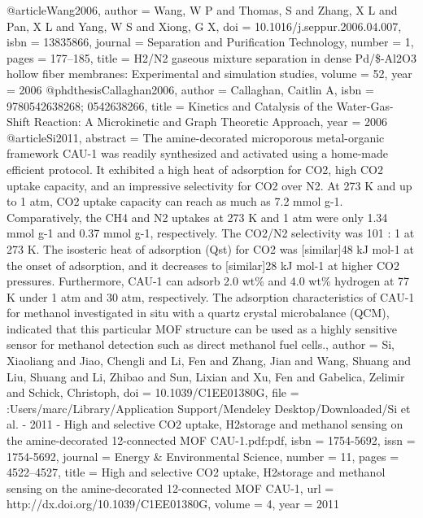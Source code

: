@article{Wang2006,
author = {Wang, W P and Thomas, S and Zhang, X L and Pan, X L and Yang, W S and Xiong, G X},
doi = {10.1016/j.seppur.2006.04.007},
isbn = {13835866},
journal = {Separation and Purification Technology},
number = {1},
pages = {177--185},
title = {{H2/N2 gaseous mixture separation in dense Pd/{\$}\alpha{\$}-Al2O3 hollow fiber membranes: Experimental and simulation studies}},
volume = {52},
year = {2006}
}
@phdthesis{Callaghan2006,
author = {Callaghan, Caitlin A},
isbn = {9780542638268; 0542638266},
title = {{Kinetics and Catalysis of the Water-Gas-Shift Reaction: A Microkinetic and Graph Theoretic Approach}},
year = {2006}
}
@article{Si2011,
abstract = {The amine-decorated microporous metal-organic framework CAU-1 was readily synthesized and activated using a home-made efficient protocol. It exhibited a high heat of adsorption for CO2, high CO2 uptake capacity, and an impressive selectivity for CO2 over N2. At 273 K and up to 1 atm, CO2 uptake capacity can reach as much as 7.2 mmol g-1. Comparatively, the CH4 and N2 uptakes at 273 K and 1 atm were only 1.34 mmol g-1 and 0.37 mmol g-1, respectively. The CO2/N2 selectivity was 101 : 1 at 273 K. The isosteric heat of adsorption (Qst) for CO2 was [similar]48 kJ mol-1 at the onset of adsorption, and it decreases to [similar]28 kJ mol-1 at higher CO2 pressures. Furthermore, CAU-1 can adsorb 2.0 wt{\%} and 4.0 wt{\%} hydrogen at 77 K under 1 atm and 30 atm, respectively. The adsorption characteristics of CAU-1 for methanol investigated in situ with a quartz crystal microbalance (QCM), indicated that this particular MOF structure can be used as a highly sensitive sensor for methanol detection such as direct methanol fuel cells.},
author = {Si, Xiaoliang and Jiao, Chengli and Li, Fen and Zhang, Jian and Wang, Shuang and Liu, Shuang and Li, Zhibao and Sun, Lixian and Xu, Fen and Gabelica, Zelimir and Schick, Christoph},
doi = {10.1039/C1EE01380G},
file = {:Users/marc/Library/Application Support/Mendeley Desktop/Downloaded/Si et al. - 2011 - High and selective CO2 uptake, H2storage and methanol sensing on the amine-decorated 12-connected MOF CAU-1.pdf:pdf},
isbn = {1754-5692},
issn = {1754-5692},
journal = {Energy {\&} Environmental Science},
number = {11},
pages = {4522--4527},
title = {{High and selective CO2 uptake, H2storage and methanol sensing on the amine-decorated 12-connected MOF CAU-1}},
url = {http://dx.doi.org/10.1039/C1EE01380G},
volume = {4},
year = {2011}
}
